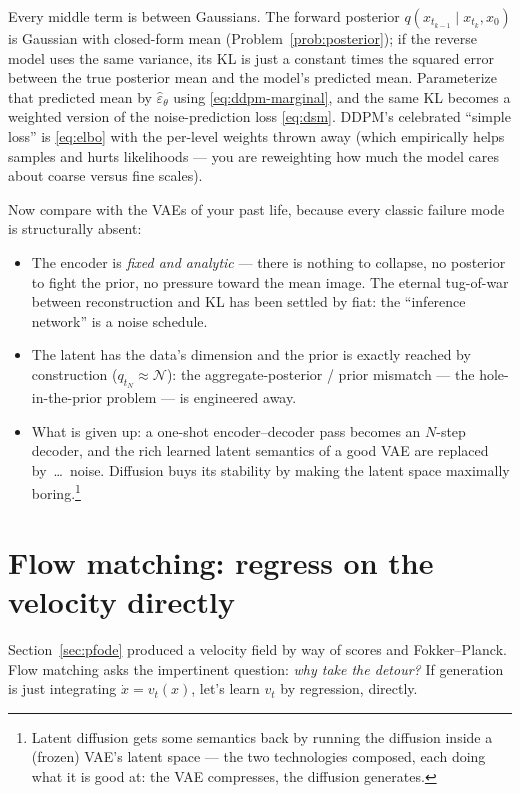 \documentclass[10pt,a4paper]{article}
\newcommand{\veps}{\varepsilon}
\begin{document}
Every middle term is between Gaussians. The forward posterior
$q(x_{t_{k-1}} \mid x_{t_k}, x_0)$ is Gaussian with closed-form mean
(Problem~\ref{prob:posterior}); if the reverse model uses the same
variance, its KL is just a constant times the squared error between the
true posterior mean and the model's predicted mean. Parameterize that
predicted mean by $\hat\veps_\theta$ using
\eqref{eq:ddpm-marginal}, and the same KL becomes a weighted version of
the noise-prediction loss \eqref{eq:dsm}. DDPM's celebrated ``simple
loss'' is \eqref{eq:elbo} with the per-level weights thrown away (which
empirically helps samples and hurts likelihoods --- you are reweighting
how much the model cares about coarse versus fine scales).

Now compare with the VAEs of your past life, because every classic failure
mode is structurally absent:
\begin{itemize}
\item The encoder is \emph{fixed and analytic} --- there is nothing to
collapse, no posterior to fight the prior, no pressure toward the mean
image. The eternal tug-of-war between reconstruction and KL has been
settled by fiat: the ``inference network'' is a noise schedule.
\item The latent has the data's dimension and the prior is exactly reached
by construction ($q_{t_N} \approx \mathcal{N}$): the aggregate-posterior
/ prior mismatch --- the hole-in-the-prior problem --- is engineered away.
\item What is given up: a one-shot encoder--decoder pass becomes an
$N$-step decoder, and the rich learned latent semantics of a good VAE are
replaced by~\dots\ noise. Diffusion buys its stability by making the latent
space maximally boring.\footnote{Latent diffusion gets some semantics back
by running the diffusion inside a (frozen) VAE's latent space --- the two
technologies composed, each doing what it is good at: the VAE compresses,
the diffusion generates.}
\end{itemize}

\section{Flow matching: regress on the velocity directly}
\label{sec:fm}

Section~\ref{sec:pfode} produced a velocity field by way of scores and
Fokker--Planck. Flow matching asks the impertinent question: \emph{why
take the detour?} If generation is just integrating $\dot x = v_t(x)$,
let's learn $v_t$ by regression, directly.
\end{document}
